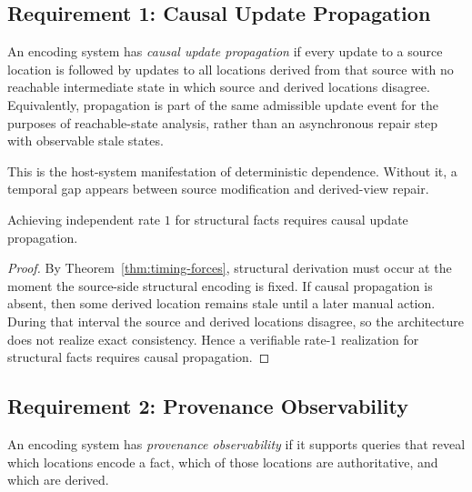 \subsection{Requirement 1: Causal Update Propagation}\label{sec:causal-propagation}

\begin{definition}\label{def:causal-propagation}
An encoding system has \emph{causal update propagation} if every update to a source location is followed by updates to all locations derived from that source with no reachable intermediate state in which source and derived locations disagree. Equivalently, propagation is part of the same admissible update event for the purposes of reachable-state analysis, rather than an asynchronous repair step with observable stale states.
\end{definition}

This is the host-system manifestation of deterministic dependence. Without it, a temporal gap appears between source modification and derived-view repair.

\begin{theorem}\label{thm:causal-necessary}
Achieving independent rate $1$ for structural facts requires causal update propagation.
\end{theorem}

\begin{proof}
By Theorem~\ref{thm:timing-forces}, structural derivation must occur at the moment the source-side structural encoding is fixed. If causal propagation is absent, then some derived location remains stale until a later manual action. During that interval the source and derived locations disagree, so the architecture does not realize exact consistency. Hence a verifiable rate-$1$ realization for structural facts requires causal propagation.
\end{proof}

\subsection{Requirement 2: Provenance Observability}\label{sec:provenance-observability}

\begin{definition}\label{def:provenance-observability}
An encoding system has \emph{provenance observability} if it supports queries that reveal which locations encode a fact, which of those locations are authoritative, and which are derived.
\end{definition}

